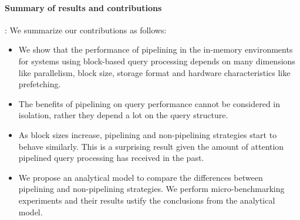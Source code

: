 \paragraph*{\bf{Summary of results and contributions}}:
%
%
We summarize our contributions as follows:
\begin{itemize}
	\item We show that the performance of pipelining in the in-memory environments for systems using block-based query processing depends on many dimensions like parallelism, block size, storage format and hardware characteristics like prefetching. 
	\item The benefits of pipelining on query performance cannot be considered in isolation, rather they depend a lot on the query structure.
	\item As block sizes increase, pipelining and non-pipelining strategies start to behave similarly. This is a surprising result given the amount of attention pipelined query processing has received in the past. 
	\item We propose an analytical model to compare the differences between pipelining and non-pipelining strategies. We perform micro-benchmarking experiments and their results ustify the conclusions from the analytical model.
\end{itemize}
